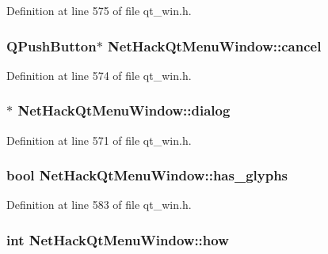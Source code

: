 Definition at line 575 of file qt\+\_\+win.\+h.

\hypertarget{classNetHackQtMenuWindow_ad3518cf90fdcf236975aca221b9e4ca8}{
\subsubsection[{cancel}]{\setlength{\rightskip}{0pt plus 5cm}Q\+Push\+Button$\ast$ Net\+Hack\+Qt\+Menu\+Window\+::cancel\hspace{0.3cm}{\ttfamily [private]}}}\label{classNetHackQtMenuWindow_ad3518cf90fdcf236975aca221b9e4ca8}


Definition at line 574 of file qt\+\_\+win.\+h.

\hypertarget{classNetHackQtMenuWindow_af1c015a42d63ee6a4a90e2f4e4d85445}{
\subsubsection[{dialog}]{$\ast$ Net\+Hack\+Qt\+Menu\+Window\+::dialog\hspace{0.3cm}{\ttfamily [private]}}}\label{classNetHackQtMenuWindow_af1c015a42d63ee6a4a90e2f4e4d85445}


Definition at line 571 of file qt\+\_\+win.\+h.

\hypertarget{classNetHackQtMenuWindow_a01594b232770368bda4a390f85b0eb93}{
\subsubsection[{has\+\_\+glyphs}]{\setlength{\rightskip}{0pt plus 5cm}bool Net\+Hack\+Qt\+Menu\+Window\+::has\+\_\+glyphs\hspace{0.3cm}{\ttfamily [private]}}}\label{classNetHackQtMenuWindow_a01594b232770368bda4a390f85b0eb93}


Definition at line 583 of file qt\+\_\+win.\+h.

\hypertarget{classNetHackQtMenuWindow_aeedf5ff2753872ccbcaf8680f0b6071b}{
\subsubsection[{how}]{\setlength{\rightskip}{0pt plus 5cm}int Net\+Hack\+Qt\+Menu\+Window\+::how\hspace{0.3cm}{\ttfamily [private]}}}\label{classNetHackQtMenuWindow_aeedf5ff2753872ccbcaf8680f0b6071b}


